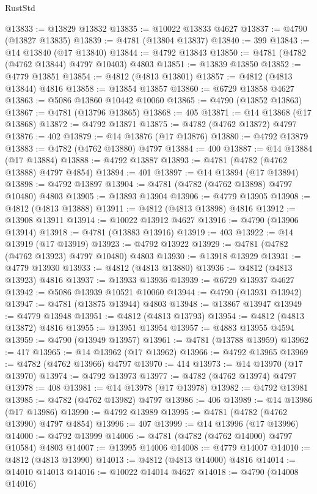\begin{lexlean}{RustStd}
\begin{coremodule}
@13833 := @13829 @13832
@13835 := @10022 @13833 @4627
@13837 := @4790 (@13827 @13835)
@13839 := @4781 (@13804 @13837)
@13840 := 399
@13843 := @14 @13840 (@17 @13840)
@13844 := @4792 @13843
@13850 := @4781 (@4782 (@4762 @13844) @4797 @10403) @4803
@13851 := @13839 @13850
@13852 := @4779 @13851
@13854 := @4812 (@4813 @13801)
@13857 := @4812 (@4813 @13844) @4816
@13858 := @13854 @13857
@13860 := @6729 @13858 @4627
@13863 := @5086 @13860 @10442 @10060
@13865 := @4790 (@13852 @13863)
@13867 := @4781 (@13796 @13865)
@13868 := 405
@13871 := @14 @13868 (@17 @13868)
@13872 := @4792 @13871
@13875 := @4782 (@4762 @13872) @4797
@13876 := 402
@13879 := @14 @13876 (@17 @13876)
@13880 := @4792 @13879
@13883 := @4782 (@4762 @13880) @4797
@13884 := 400
@13887 := @14 @13884 (@17 @13884)
@13888 := @4792 @13887
@13893 := @4781 (@4782 (@4762 @13888) @4797 @4854)
@13894 := 401
@13897 := @14 @13894 (@17 @13894)
@13898 := @4792 @13897
@13904 := @4781 (@4782 (@4762 @13898) @4797 @10480) @4803
@13905 := @13893 @13904
@13906 := @4779 @13905
@13908 := @4812 (@4813 @13888)
@13911 := @4812 (@4813 @13898) @4816
@13912 := @13908 @13911
@13914 := @10022 @13912 @4627
@13916 := @4790 (@13906 @13914)
@13918 := @4781 (@13883 @13916)
@13919 := 403
@13922 := @14 @13919 (@17 @13919)
@13923 := @4792 @13922
@13929 := @4781 (@4782 (@4762 @13923) @4797 @10480) @4803
@13930 := @13918 @13929
@13931 := @4779 @13930
@13933 := @4812 (@4813 @13880)
@13936 := @4812 (@4813 @13923) @4816
@13937 := @13933 @13936
@13939 := @6729 @13937 @4627
@13942 := @5086 @13939 @10521 @10060
@13944 := @4790 (@13931 @13942)
@13947 := @4781 (@13875 @13944) @4803
@13948 := @13867 @13947
@13949 := @4779 @13948
@13951 := @4812 (@4813 @13793)
@13954 := @4812 (@4813 @13872) @4816
@13955 := @13951 @13954
@13957 := @4883 @13955 @4594
@13959 := @4790 (@13949 @13957)
@13961 := @4781 (@13788 @13959)
@13962 := 417
@13965 := @14 @13962 (@17 @13962)
@13966 := @4792 @13965
@13969 := @4782 (@4762 @13966) @4797
@13970 := 414
@13973 := @14 @13970 (@17 @13970)
@13974 := @4792 @13973
@13977 := @4782 (@4762 @13974) @4797
@13978 := 408
@13981 := @14 @13978 (@17 @13978)
@13982 := @4792 @13981
@13985 := @4782 (@4762 @13982) @4797
@13986 := 406
@13989 := @14 @13986 (@17 @13986)
@13990 := @4792 @13989
@13995 := @4781 (@4782 (@4762 @13990) @4797 @4854)
@13996 := 407
@13999 := @14 @13996 (@17 @13996)
@14000 := @4792 @13999
@14006 := @4781 (@4782 (@4762 @14000) @4797 @10584) @4803
@14007 := @13995 @14006
@14008 := @4779 @14007
@14010 := @4812 (@4813 @13990)
@14013 := @4812 (@4813 @14000) @4816
@14014 := @14010 @14013
@14016 := @10022 @14014 @4627
@14018 := @4790 (@14008 @14016)

\end{coremodule}
\end{lexlean}
